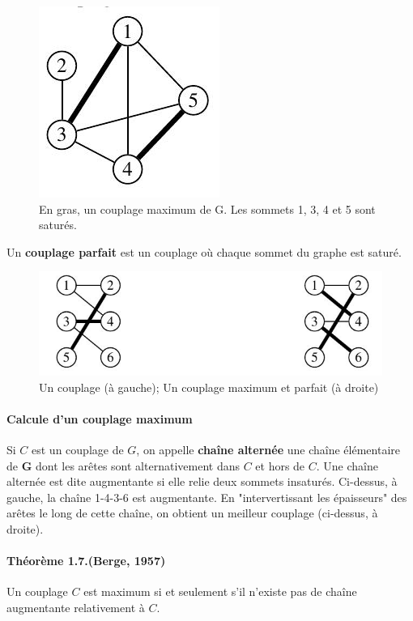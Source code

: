\begin{figure}[h]
\centering
\includegraphics[width=0.3\linewidth]{images/graph8}
\caption{En gras, un couplage maximum de G. Les sommets 1, 3, 4 et 5 sont saturés.}
\label{fig:graph8}
\end{figure}

Un \textbf{couplage parfait} est un couplage où chaque sommet du graphe est saturé.

\begin{figure}[h]
\centering
\includegraphics[width=0.7\linewidth]{images/graph9}
\caption{Un couplage (à gauche); Un couplage maximum et parfait (à droite)}
\label{fig:graph9}
\end{figure}

\paragraph*{Calcule d'un couplage maximum }
Si $ C $ est un couplage de $ G $, on appelle \textbf{chaîne alternée} une chaîne élémentaire de \textbf{G} dont
les arêtes sont alternativement dans $ C $ et hors de $ C $.
Une chaîne alternée est dite augmentante si elle relie deux sommets insaturés. Ci-dessus,
à gauche, la chaîne 1-4-3-6 est augmentante. En "intervertissant les épaisseurs" des arêtes
le long de cette chaîne, on obtient un meilleur couplage (ci-dessus, à droite).

\paragraph*{Théorème 1.7.(Berge, 1957)} Un couplage $ C $ est maximum si et seulement 
s'il n'existe pas de chaîne augmentante
relativement à $ C $.


